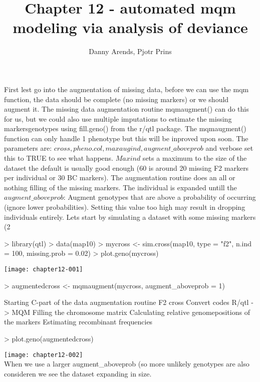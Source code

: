 \documentclass[a4paper]{article}
\title { Chapter 12 - automated mqm modeling via analysis of deviance }
\author { Danny Arends, Pjotr Prins }
\begin{document}
\maketitle
\clearpage
First lest go into the augmentation of missing data, before we can use the mqm function, the data should be complete (no missing markers)
or we should augment it. The missing data augmentation routine mqmaugment() can do this for us, but we could also use multiple imputations
to estimate the missing markersgenotypes using fill.geno() from the r/qtl package. The mqmaugment() function can only handle 1 phenotype but this will be inproved upon soon. The parameters are:
$cross, pheno.col, maxaugind, augment\_aboveprob$ and verbose set this to TRUE to see what happens. $Maxind$ sets a maximum to the size of the dataset the default is usually good enough (60 is around 20 missing F2 markers per individual or 30 BC markers). The augmentation routine does an all or nothing filling of the missing markers. The individual is expanded untill the $augment\_aboveprob$: Augment genotypes that are above a probability of occurring (ignore lower probabilities). Setting this value too high may result in dropping individuals entirely.
Lets start by simulating a dataset with some missing markers (2%
\\
\begin{Schunk}
\begin{Sinput}
> library(qtl)
> data(map10)
> mycross <- sim.cross(map10, type = "f2", n.ind = 100, missing.prob = 0.02)
> plot.geno(mycross)
\end{Sinput}
\end{Schunk}
\texttt{[image: chapter12-001]}
\begin{Schunk}
\begin{Sinput}
> augmentedcross <- mqmaugment(mycross, augment_aboveprob = 1)
\end{Sinput}
\begin{Soutput}
Starting C-part of the data augmentation routine
F2 cross
Convert codes R/qtl -> MQM
Filling the chromosome matrix
Calculating relative genomepositions of the markers
Estimating recombinant frequencies
\end{Soutput}
\begin{Sinput}
> plot.geno(augmentedcross)
\end{Sinput}
\end{Schunk}
\texttt{[image: chapter12-002]}
\\
When we use a larger augment_aboveprob (so more unlikely genotypes are also consideren we see the dataset expanding in size.
\end{document}
